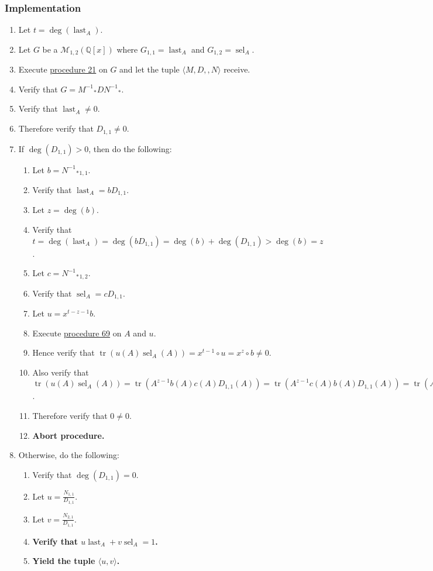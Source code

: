 \documentclass[twocolumn]{article}
\DeclareMathOperator{\tr}{tr}
\DeclareMathOperator{\sel}{sel}
\DeclareMathOperator{\last}{last}
\begin{document}
			\subsubsection{Implementation}
				\begin{enumerate}
					\item Let $t=\deg(\last_A)$.
					\item Let $G$ be a $\mathcal{M}_{1,2}(\mathbb{Q}[x])$ where $G_{1,1}=\last_A$ and $G_{1,2}=\sel_A$.
					\item Execute \hyperref[sec:procedure 21]{procedure 21} on $G$ and let the tuple $\langle M,D,,N\rangle$ receive.
					\item Verify that $G={M^{-1}}_*D{N^{-1}}_*$.
					\item Verify that $\last_A\ne 0$.
					\item Therefore verify that $D_{1,1}\ne 0$.
					\item If $\deg(D_{1,1})>0$, then do the following:
					\begin{enumerate}
						\item Let $b={{N^{-1}}_*}_{1,1}$.
						\item Verify that $\last_A=bD_{1,1}$.
						\item Let $z=\deg(b)$.
						\item Verify that $t=\deg(\last_A)=\deg(bD_{1,1})=\deg(b)+\deg(D_{1,1})>\deg(b)=z$.
						\item Let $c={{N^{-1}}_*}_{1,2}$.
						\item Verify that $\sel_A=cD_{1,1}$.
						\item Let $u=x^{t-z-1}b$.
						\item Execute \hyperref[sec:procedure 69]{procedure 69} on $A$ and $u$.
						\item Hence verify that $\tr(u(A)\sel_A(A))=x^{t-1}\circ u=x^z\circ b\ne 0$.
						\item Also verify that $\tr(u(A)\sel_A(A))=\tr(A^{z-1}b(A)c(A)D_{1,1}(A))=\tr(A^{z-1}c(A)b(A)D_{1,1}(A))=\tr(A^{z-1}c(A)\last_A(A))=\tr(A^{z-1}c(A)0_{m\times m})=\tr(0_{m\times m})=0$.
						\item Therefore verify that $0\ne 0$.
						\item \textbf{Abort procedure.}
					\end{enumerate}
					\item Otherwise, do the following:
					\begin{enumerate}
						\item Verify that $\deg(D_{1,1})=0$.
						\item Let $u=\frac{N_{1,1}}{D_{1,1}}$.
						\item Let $v=\frac{N_{2,1}}{D_{1,1}}$.
						\item \textbf{Verify that $u\last_A+v\sel_A=1$.}
						\item \textbf{Yield the tuple $\langle u,v\rangle$.}
					\end{enumerate}
				\end{enumerate}
\end{document}
